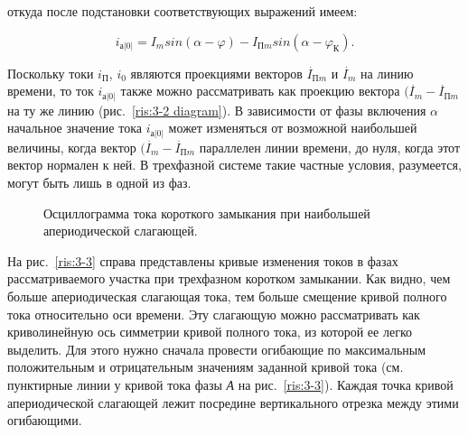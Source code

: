 откуда после подстановки соответствующих выражений имеем:

\begin{equation}
	i_{\text{а}|0|} = I_m sin(\alpha - \varphi) - I_{\text{П}m} sin(\alpha - \varphi_{\text{К}}).
	\label{eq:3-5 i_a0}
\end{equation}

Поскольку токи $ i_{\text{П}} $, $ i_0 $ являются проекциями векторов $ \overset{\;.}{I}_{\text{П}m} $ и $ \overset{\;.}{I}_m $ на линию времени, то ток $ 	i_{\text{а}|0|} $ также можно рассматривать как проекцию вектора $ (\overset{\;.}{I}_m - \overset{\;.}{I}_{\text{П}m} $ на ту же линию (рис.~\ref{ris:3-2 diagram}). В зависимости от фазы включения $ \alpha $ начальное значение тока $ 	i_{\text{а}|0|} $ может изменяться от возможной наибольшей величины, когда вектор $ (\overset{\;.}{I}_m - \overset{\;.}{I}_{\text{П}m} $ параллелен линии времени, до нуля, когда этот вектор нормален к ней. В трехфазной системе такие частные условия, разумеется, могут быть лишь в одной из фаз.

\begin{figure}
	\caption{Осциллограмма тока короткого замыкания при наибольшей апериодической слагающей.}
	\label{ris:3-4}
\end{figure}

На рис.~\ref{ris:3-3} справа представлены кривые изменения токов в фазах рассматриваемого участка при трехфазном коротком замыкании. Как видно, чем больше апериодическая слагающая тока, тем больше смещение кривой полного тока относительно оси времени. Эту слагающую можно рассматривать как криволинейную ось симметрии кривой полного тока, из которой ее легко выделить. Для этого нужно сначала провести огибающие по максимальным положительным и отрицательным значениям заданной кривой тока (см. пунктирные линии у кривой тока фазы \textit{А} на рис.~\ref{ris:3-3}). Каждая точка кривой апериодической слагающей лежит посредине вертикального отрезка между этими огибающими.

